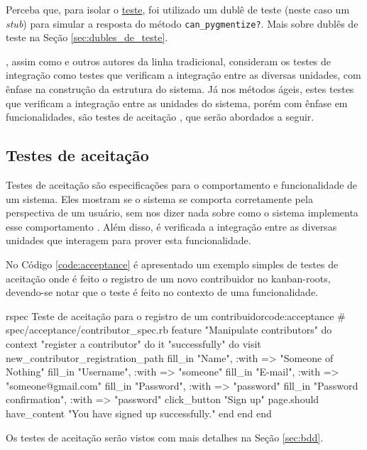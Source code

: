 Perceba que, para isolar o \hyperref[code:integration_spec]{teste}, foi utilizado um dublê de teste (neste caso um \textit{stub}) para simular a resposta do método \texttt{can\_pygmentize?}. Mais sobre dublês de teste na Seção \ref{sec:dubles_de_teste}.

, assim como  e outros autores da linha tradicional, consideram os testes de integração como testes que verificam a integração entre as diversas unidades, com ênfase na construção da estrutura do sistema. Já nos métodos ágeis, estes testes que verificam a integração entre as unidades do sistema, porém com ênfase em funcionalidades, são testes de aceitação \cite{XPTeles}, que serão abordados a seguir.


\subsection{Testes de aceitação}
\label{ssub:testes_de_aceitacao}

Testes de aceitação são especificações para o comportamento e funcionalidade de um sistema. Eles mostram se o sistema se comporta corretamente pela perspectiva de um usuário, sem nos dizer nada sobre como o sistema implementa esse comportamento \cite{TestDrivenKoskela}. Além disso, é verificada a integração entre as diversas unidades que interagem para prover esta funcionalidade.

No Código \ref{code:acceptance} é apresentado um exemplo simples de testes de aceitação onde é feito o registro de um novo contribuidor no kanban-roots, devendo-se notar que o teste é feito no contexto de uma funcionalidade.

\begin{mycode}{rspec}%
{Teste de aceitação para o registro de um contribuidor}{code:acceptance}
# spec/acceptance/contributor_spec.rb
feature "Manipulate contributors" do
  context "register a contributor" do
    it "successfully" do
      visit new_contributor_registration_path
      fill_in "Name", :with => "Someone of Nothing"
      fill_in "Username", :with => "someone"
      fill_in "E-mail", :with => "someone@gmail.com"
      fill_in "Password", :with => "password"
      fill_in "Password confirmation", :with => "password"
      click_button "Sign up"
      page.should have_content "You have signed up successfully."
    end
  end
end
\end{mycode}

Os testes de aceitação serão vistos com mais detalhes na Seção \ref{sec:bdd}.


